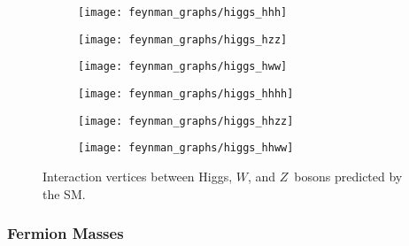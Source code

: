\begin{figure}[htbp]
  \centering

  \begin{subfigure}{0.33\textwidth}
    \centering
    \texttt{[image: feynman\_graphs/higgs\_hhh]}
    \subcaption{}
    \label{fig:vertex_hhh}
  \end{subfigure}%
  \begin{subfigure}{0.33\textwidth}
    \centering
    \texttt{[image: feynman\_graphs/higgs\_hzz]}
    \subcaption{}
  \end{subfigure}%
  \begin{subfigure}{0.33\textwidth}
    \centering
    \texttt{[image: feynman\_graphs/higgs\_hww]}
    \subcaption{}
  \end{subfigure}

  \vspace{1em}

  \begin{subfigure}{0.33\textwidth}
    \centering
    \texttt{[image: feynman\_graphs/higgs\_hhhh]}
    \subcaption{}
    \label{fig:vertex_hhhh}
  \end{subfigure}%
  \begin{subfigure}{0.33\textwidth}
    \centering
    \texttt{[image: feynman\_graphs/higgs\_hhzz]}
    \subcaption{}
  \end{subfigure}%
  \begin{subfigure}{0.33\textwidth}
    \centering
    \texttt{[image: feynman\_graphs/higgs\_hhww]}
    \subcaption{}
  \end{subfigure}

  \caption[Interaction vertices between Higgs, $W$, and $Z$~bosons predicted by
  the SM.]{Interaction vertices between Higgs, $W$, and $Z$~bosons predicted by
    the SM.}%
  \label{fig:higgs_vertices}
\end{figure}




\subsubsection{Fermion Masses}

